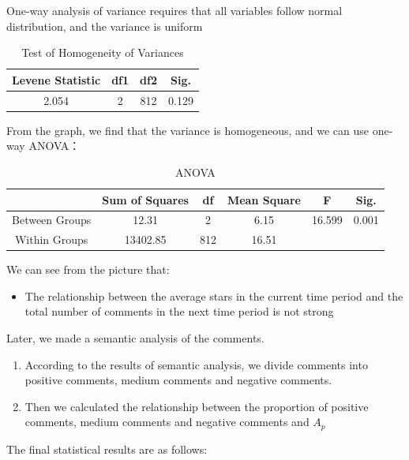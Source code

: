 \documentclass{mcmthesis}
\begin{document}
One-way analysis of variance requires that all variables follow normal distribution, and the variance is uniform\\
\begin{table}[H]
	\center
	\caption{Test of Homogeneity of Variances}
	\label{type}
	\begin{tabular}{c|c|c|c}
		\hline
		\textbf{Levene Statistic} & \textbf{df1}& \textbf{df2}& \textbf{Sig.} \\ \hline 
		2.054                     & 2           & 812         & 0.129         \\ \hline
	\end{tabular}
\end{table}
From the graph, we find that the variance is homogeneous, and we can use one-way ANOVA：\\
\begin{table}[H]
	\center
	\caption{ANOVA}
	\label{type}
	\begin{tabular}{c|c|c|c|c|c}
		\hline
		\textbf{ } & \textbf{Sum of Squares} & \textbf{df}& \textbf{Mean Square}& \textbf{F}&  \textbf{Sig.} \\ \hline 
		Between Groups                     & 12.31           & 2         & 6.15    &16.599 &0.001   \\ 
		Within Groups                     & 13402.85          & 812         & 16.51    &  & \\ \hline		
	\end{tabular}
\end{table}
We can see from the picture that:
\begin{itemize}
	\item The relationship between the average stars in the current time period and the total number of comments in the next time period is not strong
\end{itemize}
Later, we made a semantic analysis of the comments.
\begin{enumerate}
	\item According to the results of semantic analysis, we divide comments into positive comments, medium comments and negative comments.
	\item Then we calculated the relationship between the proportion of positive comments, medium comments and negative comments and $A_p $
\end{enumerate}
The final statistical results are as follows:\\
\end{document}
